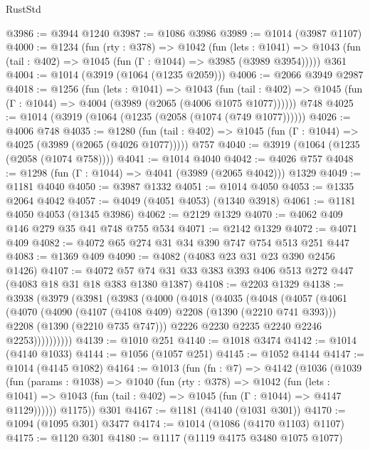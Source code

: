 \begin{lexlean}{RustStd}
\begin{coremodule}
@3986 := @3944 @1240
@3987 := @1086 @3986
@3989 := @1014 (@3987 @1107)
@4000 := @1234
    (fun (rty : @378) =>
    @1042
      (fun (lets : @1041) =>
      @1043 (fun (tail : @402) => @1045 (fun (Γ : @1044) => @3985 (@3989 @3954)))))
    @361
@4004 := @1014 (@3919 (@1064 (@1235 @2059)))
@4006 := @2066 @3949 @2987
@4018 := @1256
    (fun (lets : @1041) =>
    @1043
      (fun (tail : @402) => @1045 (fun (Γ : @1044) => @4004 (@3989 (@2065 (@4006 @1075 @1077))))))
    @748
@4025 := @1014 (@3919 (@1064 (@1235 (@2058 (@1074 (@749 @1077))))))
@4026 := @4006 @748
@4035 := @1280
    (fun (tail : @402) => @1045 (fun (Γ : @1044) => @4025 (@3989 (@2065 (@4026 @1077)))))
    @757
@4040 := @3919 (@1064 (@1235 (@2058 (@1074 @758))))
@4041 := @1014 @4040
@4042 := @4026 @757
@4048 := @1298 (fun (Γ : @1044) => @4041 (@3989 (@2065 @4042))) @1329
@4049 := @1181 @4040
@4050 := @3987 @1332
@4051 := @1014 @4050
@4053 := @1335 @2064 @4042
@4057 := @4049 (@4051 @4053) (@1340 @3918)
@4061 := @1181 @4050 @4053 (@1345 @3986)
@4062 := @2129 @1329
@4070 := @4062 @409 @146 @279 @35 @41 @748 @755 @534
@4071 := @2142 @1329
@4072 := @4071 @409
@4082 := @4072 @65 @274 @31 @34 @390 @747 @754 @513 @251 @447
@4083 := @1369 @409
@4090 := @4082 (@4083 @23 @31 @23 @390 @2456 @1426)
@4107 := @4072 @57 @74 @31 @33 @383 @393 @406 @513 @272 @447 (@4083 @18 @31 @18 @383 @1380 @1387)
@4108 := @2203 @1329
@4138 := @3938
    (@3979
      (@3981
        (@3983
          (@4000
            (@4018
              (@4035
                (@4048
                  (@4057
                    (@4061
                      (@4070
                        (@4090
                          (@4107 (@4108 @409) @2208 (@1390 (@2210 @741 @393)))
                          @2208
                          (@1390 (@2210 @735 @747)))
                        @2226
                        @2230
                        @2235
                        @2240
                        @2246
                        @2253))))))))))
@4139 := @1010 @251
@4140 := @1018 @3474
@4142 := @1014 (@4140 @1033)
@4144 := @1056 (@1057 @251)
@4145 := @1052 @4144
@4147 := @1014 (@4145 @1082)
@4164 := @1013
    (fun (fn : @7) =>
    @4142
      (@1036
        (@1039
          (fun (params : @1038) =>
          @1040
            (fun (rty : @378) =>
            @1042
              (fun (lets : @1041) =>
              @1043 (fun (tail : @402) => @1045 (fun (Γ : @1044) => @4147 @1129))))))
        @1175))
    @301
@4167 := @1181 (@4140 (@1031 @301))
@4170 := @1094 (@1095 @301) @3477
@4174 := @1014 (@1086 (@4170 @1103) @1107)
@4175 := @1120 @301
@4180 := @1117 (@1119 @4175 @3480 @1075 @1077)

\end{coremodule}
\end{lexlean}
